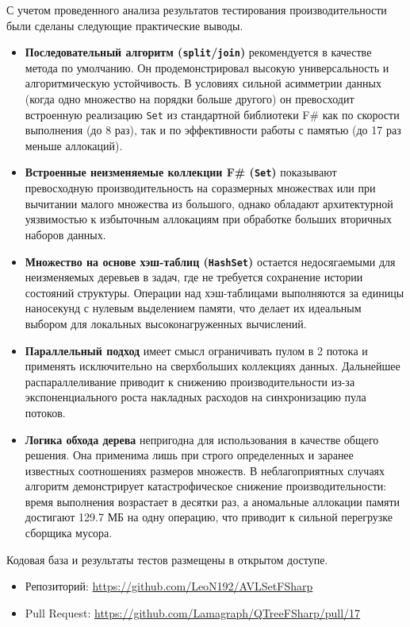 \documentclass[a4paper,12pt]{article}
\begin{document}
С учетом проведенного анализа результатов тестирования производительности были сделаны следующие практические выводы.
\begin{itemize}
    \item \textbf{Последовательный алгоритм (\texttt{split}/\texttt{join})} рекомендуется в качестве метода по умолчанию. Он продемонстрировал высокую универсальность и алгоритмическую устойчивость. В условиях сильной асимметрии данных (когда одно множество на порядки больше другого) он превосходит встроенную реализацию \verb|Set| из стандартной библиотеки F\# как по скорости выполнения (до 8 раз), так и по эффективности работы с памятью (до 17 раз меньше аллокаций).
    \item \textbf{Встроенные неизменяемые коллекции F\# (\texttt{Set})} показывают превосходную производительность на соразмерных множествах или при вычитании малого множества из большого, однако обладают архитектурной уязвимостью к избыточным аллокациям при обработке больших вторичных наборов данных.
    \item \textbf{Множество на основе хэш-таблиц (\texttt{HashSet})} остается недосягаемыми для неизменяемых деревьев в задач, где не требуется сохранение истории состояний структуры. Операции над хэш-таблицами выполняются за единицы наносекунд с нулевым выделением памяти, что делает их идеальным выбором для локальных высоконагруженных вычислений.
    \item \textbf{Параллельный подход} имеет смысл ограничивать пулом в 2 потока и применять исключительно на сверхбольших коллекциях данных. Дальнейшее распараллеливание приводит к снижению производительности из-за экспоненциального роста накладных расходов на синхронизацию пула потоков.
    \item \textbf{Логика обхода дерева} непригодна для использования в качестве общего решения. Она применима лишь при строго определенных и заранее известных соотношениях размеров множеств. В неблагоприятных случаях алгоритм демонстрирует катастрофическое снижение производительности: время выполнения возрастает в десятки раз, а аномальные аллокации памяти достигают 129.7 МБ на одну операцию, что приводит к сильной перегрузке сборщика мусора.
\end{itemize}

Кодовая база и результаты тестов размещены в открытом доступе.
\begin{itemize}
    \item Репозиторий: \url{https://github.com/LeoN192/AVLSetFSharp}
    \item Pull Request: \url{https://github.com/Lamagraph/QTreeFSharp/pull/17}
\end{itemize}
\end{document}
